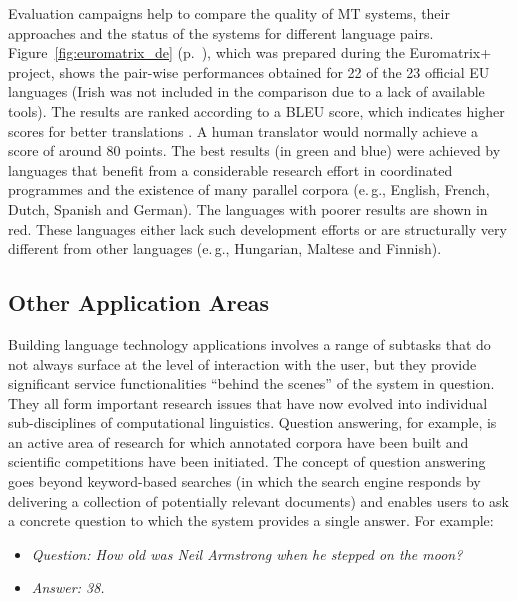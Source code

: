 \documentclass[]{../../metanetpaper}
\begin{document}
\begin{multicols}{2}
Evaluation campaigns help to compare the quality of MT systems, their approaches and the status of the systems for different language pairs. Figure~\ref{fig:euromatrix_de} (p.~\pageref{fig:euromatrix_de}), which was prepared during the Euromatrix+ project, shows the pair-wise performances obtained for 22 of the 23 official EU languages (Irish was not included in the comparison due to a lack of available tools). The results are ranked according to a BLEU score, which indicates higher scores for better translations \cite{bleu1}. A human translator would normally achieve a score of around 80 points. The best results (in green and blue) were achieved by languages that benefit from a considerable research effort in coordinated programmes and the existence of many parallel corpora (e.\,g., English, French, Dutch, Spanish and German). The languages with poorer results are shown in red. These languages either lack such development efforts or are structurally very different from other languages (e.\,g., Hungarian, Maltese and Finnish).

\subsection{Other Application Areas}

Building language technology applications involves a range of subtasks that do not always surface at the level of interaction with the user, but they provide significant service functionalities ``behind the scenes'' of the system in question. They all form important research issues that have now evolved into individual sub-disciplines of computational linguistics. Question answering, for example, is an active area of research for which annotated corpora have been built and scientific competitions have been initiated. The concept of question answering goes beyond keyword-based searches (in which the search engine responds by delivering a collection of potentially relevant documents) and enables users to ask a concrete question to which the system provides a single answer. For example:

\begin{itemize}
\item[] \textit{Question: How old was Neil Armstrong when he stepped on the moon?}
\item[] \textit{Answer: 38.}
\end{itemize}


\end{multicols}
\end{document}
